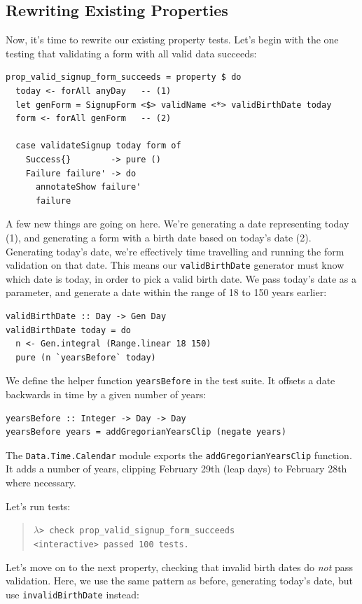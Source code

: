 \subsection{Rewriting Existing
Properties}\label{rewriting-existing-properties}

Now, it's time to rewrite our existing property tests. Let's begin with
the one testing that validating a form with all valid data succeeds:

\begin{verbatim}
prop_valid_signup_form_succeeds = property $ do
  today <- forAll anyDay   -- (1)
  let genForm = SignupForm <$> validName <*> validBirthDate today
  form <- forAll genForm   -- (2)

  case validateSignup today form of
    Success{}        -> pure ()
    Failure failure' -> do
      annotateShow failure'
      failure
\end{verbatim}
A few new things are going on here. We're generating a date representing
today (1), and generating a form with a birth date based on today's date
(2). Generating today's date, we're effectively time travelling and
running the form validation on that date. This means our
\texttt{validBirthDate} generator must know which date is today, in
order to pick a valid birth date. We pass today's date as a parameter,
and generate a date within the range of 18 to 150 years earlier:

\begin{verbatim}
validBirthDate :: Day -> Gen Day
validBirthDate today = do
  n <- Gen.integral (Range.linear 18 150)
  pure (n `yearsBefore` today)
\end{verbatim}
We define the helper function \texttt{yearsBefore} in the test suite. It
offsets a date backwards in time by a given number of years:

\begin{verbatim}
yearsBefore :: Integer -> Day -> Day
yearsBefore years = addGregorianYearsClip (negate years)
\end{verbatim}
The \texttt{Data.Time.Calendar} module exports the
\texttt{addGregorianYearsClip} function. It adds a number of years,
clipping February 29th (leap days) to February 28th where necessary.

Let's run tests:

\begin{quote}
$\lambda$\verb|> check prop_valid_signup_form_succeeds| \\
  \hspace*{1cm}\checkmark \verb|<interactive> passed 100 tests.|
\end{quote}
Let's move on to the next property, checking that invalid birth dates do
\emph{not} pass validation. Here, we use the same pattern as before,
generating today's date, but use \texttt{invalidBirthDate} instead:

